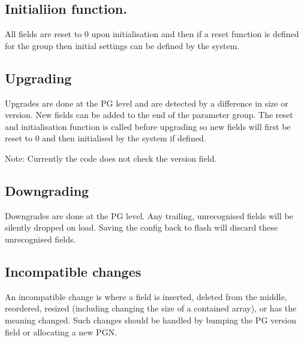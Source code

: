 \subsection*{Initialiion function.}

All fields are reset to 0 upon initialisation and then if a reset function is defined for the group then initial settings can be defined by the system.

\subsection*{Upgrading}

Upgrades are done at the P\+G level and are detected by a difference in size or version. New fields can be added to the end of the parameter group. The reset and initialisation function is called before upgrading so new fields will first be reset to 0 and then initialised by the system if defined.

Note\+: Currently the code does not check the version field.

\subsection*{Downgrading}

Downgrades are done at the P\+G level. Any trailing, unrecognised fields will be silently dropped on load. Saving the config back to flash will discard these unrecognised fields.

\subsection*{Incompatible changes}

An incompatible change is where a field is inserted, deleted from the middle, reordered, resized (including changing the size of a contained array), or has the meaning changed. Such changes should be handled by bumping the P\+G version field or allocating a new P\+G\+N. 